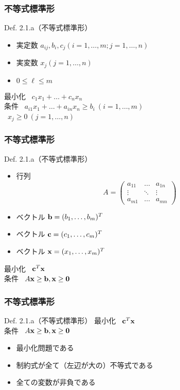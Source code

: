 \documentclass[unicode, 12pt, aspectratio = 43]{beamer}
\begin{document}
\begin{frame}[fragile]
	\frametitle{不等式標準形}
	\begin{itembox}[l]{Def. 2.1.a（不等式標準形）}
		\begin{itemize}
			\item 実定数 $a_{ij}, b_i, c_j(i = 1, \dots, m; j = 1, \dots, n)$
			\item 実変数 $x_j(j = 1, \dots, n)$
			\item $0 \le \ell \le m$
		\end{itemize}
		最小化 \ $c_1x_1+ \dots+ c_nx_n$ \\
		条件 \ $a_{i1}x_1 + \dots+ a_{in}x_n \ge b_i \ (i = 1, \dots, m)$ \\
		\   $x_j \ge 0 \ (j = 1, \dots, n)$
	\end{itembox}
\end{frame}

\begin{frame}[fragile]
	\frametitle{不等式標準形}
	\begin{itembox}[l]{Def. 2.1.a（不等式標準形）}
		\begin{itemize}
			\item 行列
\[
  A = \left(
    \begin{array}{cccc}
      a_{11} & \ldots & a_{1n} \\
      \vdots & \ddots & \vdots \\
      a_{m1} & \ldots & a_{mn}
    \end{array}
  \right)
\]	
			\item ベクトル ${\bf b} = (b_1, \dots, b_m)^T$
			\item ベクトル ${\bf c} = (c_1, \dots, c_m)^T$
			\item ベクトル ${\bf x} = (x_1, \dots, x_m)^T$
		\end{itemize}
		
		最小化 \ ${\bf c}^T {\bf x}$ \\
		条件 \ $A{\bf x} \ge {\bf b}, {\bf x} \ge {\bf 0}$
	\end{itembox}
\end{frame}

\begin{frame}[fragile]
	\frametitle{不等式標準形}
	\begin{itembox}[l]{Def. 2.1.a（不等式標準形）}
		最小化 \ ${\bf c}^T {\bf x}$ \\
		条件 \ $A{\bf x} \ge {\bf b}, {\bf x} \ge {\bf 0}$
	\end{itembox}
	\begin{itemize}
		\item 最小化問題である
		\item 制約式が全て（左辺が大の）不等式である
		\item 全ての変数が非負である
	\end{itemize}
\end{frame}
\end{document}
